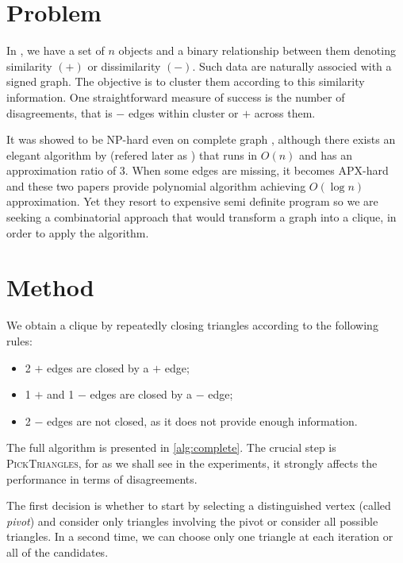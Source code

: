 \section{Problem}

In \pcc{}, we have a set of $n$ objects and a binary relationship between them
denoting similarity $(+)$  or dissimilarity $(-)$. Such data are naturally
associed with a signed graph. The objective is to cluster them according to
this similarity information. One straightforward measure of success is the
number of disagreements, that is $-$ edges within cluster or $+$ across them.

It was showed to be NP-hard even on complete graph \autocite{Bansal2002},
although there exists an elegant algorithm by \textcite{Ailon2008} (refered
later as \ccp{}) that runs in $O(n)$ and has an approximation ratio of $3$.
When some edges are missing, it becomes APX-hard
\autocites{Charikar2003}{Demaine2006} and these two papers provide polynomial
algorithm achieving $O(\log n)$ approximation. Yet they resort to expensive
semi definite program so we are seeking a combinatorial approach that would
transform a graph into a clique, in order to apply the \ccp{} algorithm.

\section{Method}

We obtain a clique by repeatedly closing triangles according to the following
rules:

\begin{itemize}
	\item 2 $+$ edges are closed by a $+$ edge;
	\item 1 $+$ and 1 $-$ edges are closed by a $-$ edge;
	\item 2 $-$ edges are not closed, as it does not provide enough
		information.
\end{itemize}

The full algorithm is presented in \autoref{alg:complete}. The crucial step
is \textsc{PickTriangles}, for as we shall see in the experiments, it strongly
affects the performance in terms of disagreements.

The first decision is whether to start by selecting a distinguished vertex
(called \emph{pivot}) and consider only triangles involving the pivot or
consider all possible triangles. In a second time, we can choose only one
triangle at each iteration or all of the candidates.

